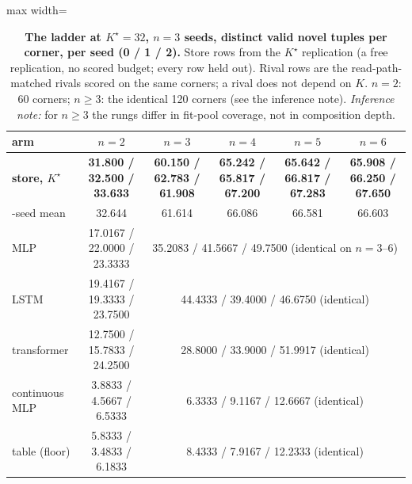 \documentclass{article}
\newcommand{\Kstar}{\ensuremath{K^{\star}}}
\begin{document}
\begin{table}[t]
\centering\small
\caption{\textbf{The ladder at $\Kstar=32$, $n=3$ seeds, distinct valid novel tuples per
corner, per seed (0 / 1 / 2).} Store rows from the $\Kstar$ replication (a free replication,
no scored budget; every row held out). Rival rows are the read-path-matched rivals scored on
the same corners; a rival does not depend on $K$. $n=2$: 60 corners; $n\ge3$: the identical
120 corners (see the inference note). \emph{Inference note:} for $n\ge3$ the rungs differ in
fit-pool coverage, not in composition depth.}
\label{tab:ladder}
\setlength{\tabcolsep}{2.6pt}
\begin{adjustbox}{max width=\linewidth}\begin{tabular}{lccccc}
\toprule
arm & $n=2$ & $n=3$ & $n=4$ & $n=5$ & $n=6$ \\
\midrule
\textbf{store, $\Kstar$} & \textbf{31.800 / 32.500 / 33.633} & \textbf{60.150 / 62.783 / 61.908} & \textbf{65.242 / 65.817 / 67.200} & \textbf{65.642 / 66.817 / 67.283} & \textbf{65.908 / 66.250 / 67.650} \\
\quad 3-seed mean & 32.644 & 61.614 & 66.086 & 66.581 & 66.603 \\
MLP & 17.0167 / 22.0000 / 23.3333 & \multicolumn{4}{c}{35.2083 / 41.5667 / 49.7500 (identical on $n=3$--$6$)} \\
LSTM & 19.4167 / 19.3333 / 23.7500 & \multicolumn{4}{c}{44.4333 / 39.4000 / 46.6750 (identical)} \\
transformer & 12.7500 / 15.7833 / 24.2500 & \multicolumn{4}{c}{28.8000 / 33.9000 / 51.9917 (identical)} \\
continuous MLP & 3.8833 / 4.5667 / 6.5333 & \multicolumn{4}{c}{6.3333 / 9.1167 / 12.6667 (identical)} \\
table (floor) & 5.8333 / 3.4833 / 6.1833 & \multicolumn{4}{c}{8.4333 / 7.9167 / 12.2333 (identical)} \\
\bottomrule
\end{tabular}\end{adjustbox}
\end{table}
\end{document}
